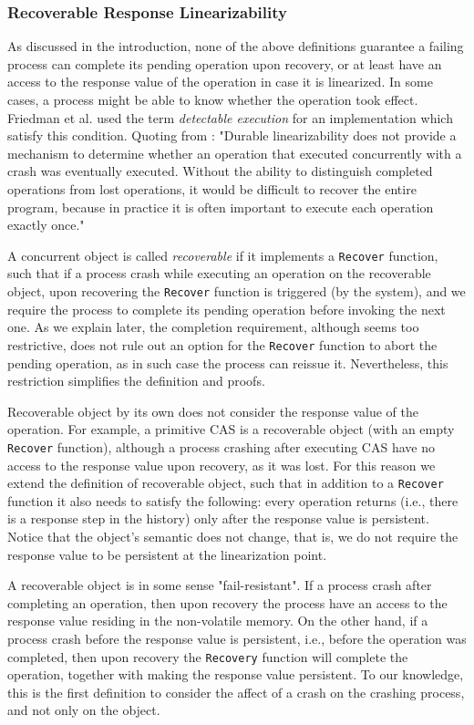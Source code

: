 \subsubsection{Recoverable Response Linearizability}
As discussed in the introduction, none of the above definitions guarantee a failing process can complete its pending operation upon recovery, or at least have an access to the response value of the operation in case it is linearized. In some cases, a process might be able to know whether the operation took effect. Friedman et al. \cite{DBLP:conf/wdag/FriedmanHMP17} used the term \textit{detectable execution} for an implementation which satisfy this condition. Quoting from \cite{DBLP:conf/wdag/FriedmanHMP17}: "Durable linearizability does not provide a mechanism to determine whether an operation that executed concurrently with a crash was eventually executed. Without the ability to distinguish completed operations from lost operations, it would be difficult to recover the entire program, because in practice it is often important to execute each operation exactly once."

A concurrent object is called \textit{recoverable} if it implements a \texttt{Recover} function, such that if a process crash while executing an operation on the recoverable object, upon recovering the \texttt{Recover} function is triggered (by the system), and we require the process to complete its pending operation before invoking the next one. As we explain later, the completion requirement, although seems too restrictive, does not rule out an option for the \texttt{Recover} function to abort the pending operation, as in such case the process can reissue it. Nevertheless, this restriction simplifies the definition and proofs.

Recoverable object by its own does not consider the response value of the operation. For example, a primitive CAS is a recoverable object (with an empty \texttt{Recover} function), although a process crashing after executing CAS have no access to the response value upon recovery, as it was lost. For this reason we extend the definition of recoverable object, such that in addition to a \texttt{Recover} function it also needs to satisfy the following: every operation returns (i.e., there is a response step in the history) only after the response value is persistent. Notice that the object's semantic does not change, that is, we do not require the response value to be persistent at the linearization point.

A recoverable object is in some sense "fail-resistant". If a process crash after completing an operation, then upon recovery the process have an access to the response value residing in the non-volatile memory. On the other hand, if a process crash before the response value is persistent, i.e., before the operation was completed, then upon recovery the \texttt{Recovery} function will complete the operation, together with making the response value persistent. To our knowledge, this is the first definition to consider the affect of a crash on the crashing process, and not only on the object.


